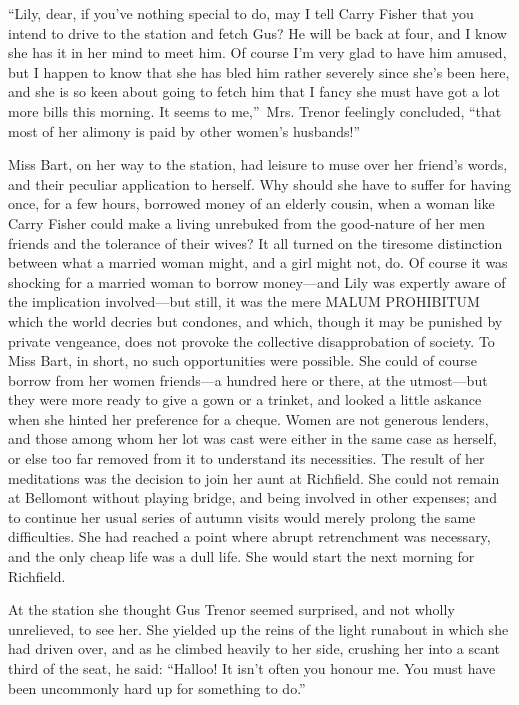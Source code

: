 \documentclass[12pt,a4paper]{book}
\begin{document}
``Lily, dear, if you've nothing special to do, may I tell Carry
Fisher that you intend to drive to the station and fetch Gus? He
will be back at four, and I know she has it in her mind to meet
him. Of course I'm very glad to have him amused, but I happen to
know that she has bled him rather severely since she's been here,
and she is so keen about going to fetch him that I fancy she must
have got a lot more bills this morning. It seems to me,''\ Mrs.
Trenor feelingly concluded, ``that most of her alimony is paid by
other women's husbands!''





Miss Bart, on her way to the station, had leisure to muse over
her friend's words, and their peculiar application to herself. 
Why should she have to suffer for having once, for a few hours,
borrowed money of an elderly cousin, when a woman like Carry
Fisher could make a living unrebuked from the good-nature of her
men friends and the tolerance of their wives? It all turned on
the tiresome distinction between what a married woman
might, and a girl might not, do. Of course it was shocking for a
married woman to borrow money---and Lily was expertly aware of the
implication involved---but still, it was the mere MALUM PROHIBITUM
which the world decries but condones, and which, though it may be
punished by private vengeance, does not provoke the collective
disapprobation of society. To Miss Bart, in short, no such
opportunities were possible. She could of course borrow from her
women friends---a hundred here or there, at the utmost---but they
were more ready to give a gown or a trinket, and looked a little
askance when she hinted her preference for a cheque. Women are
not generous lenders, and those among whom her lot was cast were
either in the same case as herself, or else too far removed from
it to understand its necessities. The result of her meditations
was the decision to join her aunt at Richfield. She could not
remain at Bellomont without playing bridge, and being involved in
other expenses; and to continue her usual series of autumn visits
would merely prolong the same difficulties. She had reached a
point where abrupt retrenchment was necessary, and the only cheap
life was a dull life. She would start the next morning for
Richfield.





At the station she thought Gus Trenor seemed surprised, and not
wholly unrelieved, to see her. She yielded up the reins of the
light runabout in which she had driven over, and as he climbed
heavily to her side, crushing her into a scant third of the seat,
he said: ``Halloo! It isn't often you honour me. You must have
been uncommonly hard up for something to do.''
\end{document}
